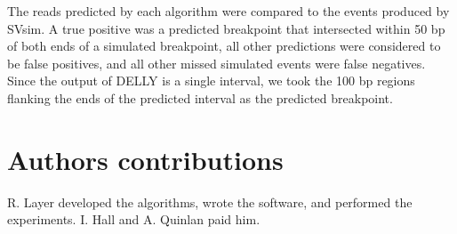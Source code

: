 \documentclass[10pt]{bmc_article}
\newenvironment{bmcformat}{\begin{raggedright}\baselineskip20pt\sloppy\setboolean{publ}{false}}{\end{raggedright}\baselineskip20pt\sloppy}
\begin{document}
\begin{bmcformat}
The reads predicted by each algorithm were compared to the events produced by
SVsim. A true positive was a predicted breakpoint that intersected within 50 bp
of both ends of a simulated breakpoint, all other predictions were considered to
be false positives, and all other missed simulated events were false negatives.
Since the output of DELLY is a single interval, we took the 100 bp regions
flanking the ends of the predicted interval as the predicted breakpoint.

%

\section*{Authors contributions}
R. Layer developed the algorithms, wrote the software, and performed the
experiments.  I. Hall and A. Quinlan paid him.


\end{bmcformat}
\end{document}
